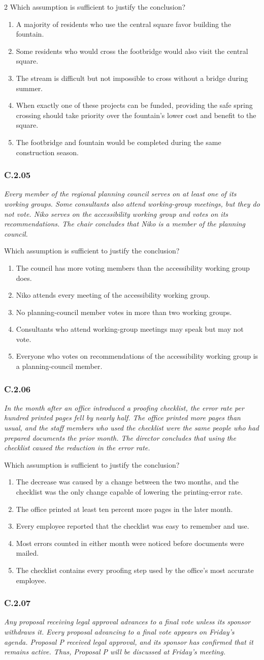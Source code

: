 \documentclass[10pt]{extarticle}
\newcommand{\choice}[1]{\item #1}
\newcommand{\bankitem}[1]{\subsubsection*{#1}}
\begin{document}
\begin{multicols}{2}
Which assumption is sufficient to justify the conclusion?
\begin{enumerate}[label=(\alph*)]
  \choice{A majority of residents who use the central square favor building the fountain.}
  \choice{Some residents who would cross the footbridge would also visit the central square.}
  \choice{The stream is difficult but not impossible to cross without a bridge during summer.}
  \choice{When exactly one of these projects can be funded, providing the safe spring crossing should take priority over the fountain's lower cost and benefit to the square.}
  \choice{The footbridge and fountain would be completed during the same construction season.}
\end{enumerate}
\bankitem{C.2.05}
\emph{Every member of the regional planning council serves on at least one of its working groups. Some consultants also attend working-group meetings, but they do not vote. Niko serves on the accessibility working group and votes on its recommendations. The chair concludes that Niko is a member of the planning council.}

Which assumption is sufficient to justify the conclusion?
\begin{enumerate}[label=(\alph*)]
  \choice{The council has more voting members than the accessibility working group does.}
  \choice{Niko attends every meeting of the accessibility working group.}
  \choice{No planning-council member votes in more than two working groups.}
  \choice{Consultants who attend working-group meetings may speak but may not vote.}
  \choice{Everyone who votes on recommendations of the accessibility working group is a planning-council member.}
\end{enumerate}
\bankitem{C.2.06}
\emph{In the month after an office introduced a proofing checklist, the error rate per hundred printed pages fell by nearly half. The office printed more pages than usual, and the staff members who used the checklist were the same people who had prepared documents the prior month. The director concludes that using the checklist caused the reduction in the error rate.}

Which assumption is sufficient to justify the conclusion?
\begin{enumerate}[label=(\alph*)]
  \choice{The decrease was caused by a change between the two months, and the checklist was the only change capable of lowering the printing-error rate.}
  \choice{The office printed at least ten percent more pages in the later month.}
  \choice{Every employee reported that the checklist was easy to remember and use.}
  \choice{Most errors counted in either month were noticed before documents were mailed.}
  \choice{The checklist contains every proofing step used by the office's most accurate employee.}
\end{enumerate}
\bankitem{C.2.07}
\emph{Any proposal receiving legal approval advances to a final vote unless its sponsor withdraws it. Every proposal advancing to a final vote appears on Friday's agenda. Proposal P received legal approval, and its sponsor has confirmed that it remains active. Thus, Proposal P will be discussed at Friday's meeting.}


\end{multicols}
\end{document}
